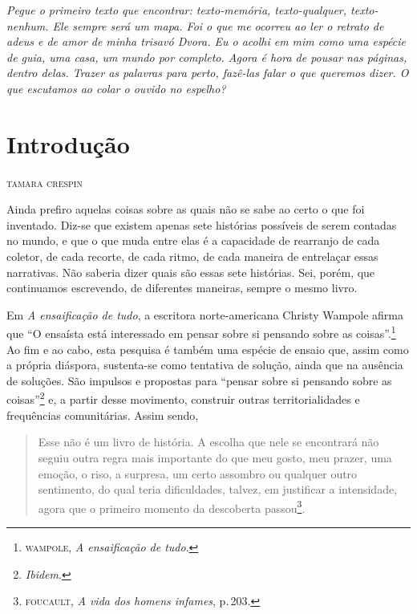 {
\mbox{}
\thispagestyle{empty}

\vfill

\footnotesize
\noindent{}\emph{Pegue o primeiro texto que encontrar: \emph{texto-memória},
\emph{texto-qualquer}, \emph{texto-nenhum}. Ele sempre será um mapa. Foi
o que me ocorreu ao ler o retrato de adeus e de amor de minha trisavó
Dvora. %
  Eu o acolhi em mim como uma espécie de guia, uma casa, um
mundo por completo. Agora é hora de pousar nas páginas, dentro delas. Trazer as palavras para perto, fazê-las falar o que queremos dizer. O que escutamos ao colar o ouvido no espelho?}

\pagebreak
}

\chapter*{Introdução\smallskip{}}

\begin{flushright}
\textsc{tamara crespin}
\end{flushright}

\noindent{}Ainda prefiro aquelas coisas sobre as quais não se sabe ao certo o que foi inventado. Diz-se que existem apenas sete histórias possíveis de serem contadas no mundo, e que o que muda entre elas é a capacidade de rearranjo de cada coletor, de cada recorte, de cada ritmo, de cada maneira de entrelaçar essas narrativas. Não saberia dizer quais são essas sete histórias. Sei, porém, que continuamos escrevendo, de diferentes maneiras, sempre o mesmo livro.

Em \emph{A ensaificação de tudo}, a escritora norte-americana Christy Wampole afirma que ``O ensaísta está interessado em pensar sobre si pensando sobre as coisas''.\footnote{\textsc{wampole}, \emph{A ensaificação de tudo}.} Ao fim e ao cabo, esta pesquisa é também uma espécie de ensaio que, assim como a própria diáspora, sustenta-se como tentativa de solução, ainda que na ausência de soluções. São impulsos e propostas para ``pensar sobre si pensando sobre as coisas''\footnote{\emph{Ibidem}.} e, a partir desse movimento, construir outras territorialidades e frequências comunitárias. Assim sendo,

\begin{quote}
Esse não é um livro de história. A escolha que nele se encontrará não
seguiu outra regra mais importante do que meu gosto, meu prazer, uma
emoção, o riso, a surpresa, um certo assombro ou qualquer outro
sentimento, do qual teria dificuldades, talvez, em justificar a
intensidade, agora que o primeiro momento da descoberta
passou\footnote{\textsc{foucault}, \emph{A vida dos homens infames}, p.\,203.}.
\end{quote}

